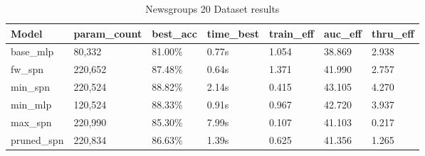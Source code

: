 \begin{table}[h!]
    \centering
    \begin{tabular}{|l|l|l|l|l|l|l|}
    \hline
    \textbf{Model} & \textbf{param\_count} & \textbf{best\_acc} & \textbf{time\_best} & \textbf{train\_eff} & \textbf{auc\_eff} & \textbf{thru\_eff} \\
    \hline
    base\_mlp & 80,332 & \cellcolor{red!25}81.00\% & 0.77s & 1.054 & \cellcolor{red!25}38.869 & 2.938 \\
    fw\_spn & 220,652 & 87.48\% & \cellcolor{green!25}0.64s & \cellcolor{green!25}1.371 & 41.990 & 2.757 \\
    min\_spn & 220,524 & \cellcolor{green!25}88.82\% & 2.14s & 0.415 & \cellcolor{green!25}43.105 & \cellcolor{green!25}4.270 \\
    min\_mlp & 120,524 & 88.33\% & 0.91s & 0.967 & 42.720 & 3.937 \\
    max\_spn & 220,990 & 85.30\% & \cellcolor{red!25}7.99s & \cellcolor{red!25}0.107 & 41.103 & \cellcolor{red!25}0.217 \\
    pruned\_spn & 220,834 & 86.63\% & 1.39s & 0.625 & 41.356 & 1.265 \\
    \hline
    \end{tabular}
    \caption{Newsgroups 20 Dataset results}
    \label{tab:newsgroupsResults}
\end{table}

